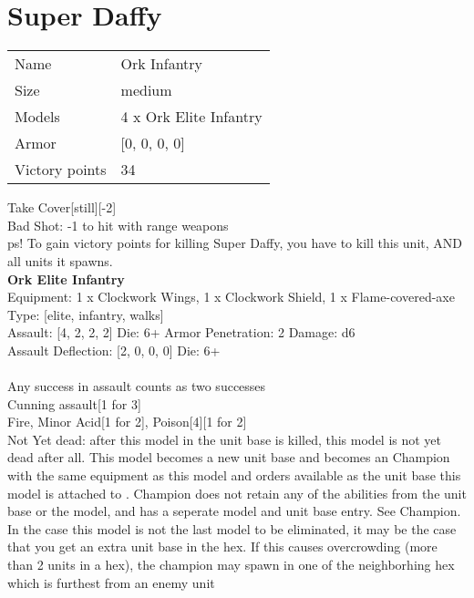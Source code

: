 \pagebreak\pagebreak

\section{ Super Daffy}

\begin{tabular}{ll}
  Name & Ork Infantry \\
  Size & medium\\
  Models & 4 x Ork Elite Infantry\\
  Armor & [0, 0, 0, 0]\\
  Victory points & 34\\
\end{tabular}

Take Cover[still][-2]\\ 
Bad Shot: -1 to hit with range weapons\\ 

ps! To gain victory points for killing Super Daffy, you have to kill this unit, AND all units it spawns.\\

{\bf Ork Elite Infantry } \\
Equipment: 1 x Clockwork Wings, 1 x Clockwork Shield, 1 x Flame-covered-axe \\
Type: [elite, infantry, walks] \\

Assault: [4, 2, 2, 2] Die: 6+ Armor Penetration: 2 Damage: d6 \\
Assault Deflection: [2, 0, 0, 0] Die: 6+\\
\\
Any success in assault counts as two successes \\
Cunning assault[1 for 3]\\ 
Fire, Minor Acid[1 for 2], Poison[4][1 for 2]\\ 

Not Yet dead: after this model in the unit base is killed, this model is not yet dead after all. This model becomes a new unit base and becomes an Champion with the same equipment as this model and orders available as the unit base this model is attached to . Champion does not retain any of the abilities from the unit base or the model, and has a seperate model and unit base entry. See Champion. In the case this model is not the last model to be eliminated, it may be the case that you get an extra unit base in the hex. If this causes overcrowding (more than 2 units in a hex), the champion may spawn in one of the neighborhing hex which is furthest from an enemy unit\\ 


